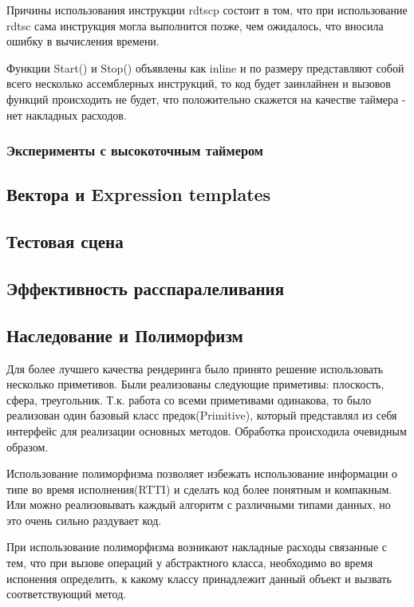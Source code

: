 \documentclass[12pt, a4paper]{article}
\begin{document}
Причины использования инструкции rdtscp состоит в том, что при использование rdtsc сама инструкция могла выполнится позже, чем ожидалось, что вносила ошибку в вычисления времени.

Функции Start() и Stop() объявлены как inline и по размеру представляют собой всего несколько ассемблерных инструкций, то код будет заинлайнен и вызовов функций происходить не будет, что положительно скажется на качестве таймера - нет накладных расходов.



\subsubsection{Эксперименты с высокоточным таймером}

\subsection{Вектора и Expression templates}

\subsection{Тестовая сцена}

\subsection{Эффективность расспаралеливания}

\subsection{Наследование и Полиморфизм}

Для более лучшего качества рендеринга было принято решение использовать несколько приметивов. Были реализованы следующие приметивы: плоскость, сфера, треугольник. Т.к. работа со всеми приметивами одинакова, то было реализован один базовый класс предок(Primitive), который представлял из себя интерфейс для реализации основных методов. Обработка происходила очевидным образом. 

Использование полиморфизма позволяет избежать использование информации о типе во время исполнения(RTTI) и сделать код более понятным и компакным. Или можно реализовывать каждый алгоритм с различными типами данных, но это очень сильно раздувает код.

При использование полиморфизма возникают накладные расходы связанные с тем, что при вызове операций у абстрактного класса, необходимо во время испонения определить, к какому классу принадлежит данный объект и вызвать соответствующий метод. 
\end{document}
